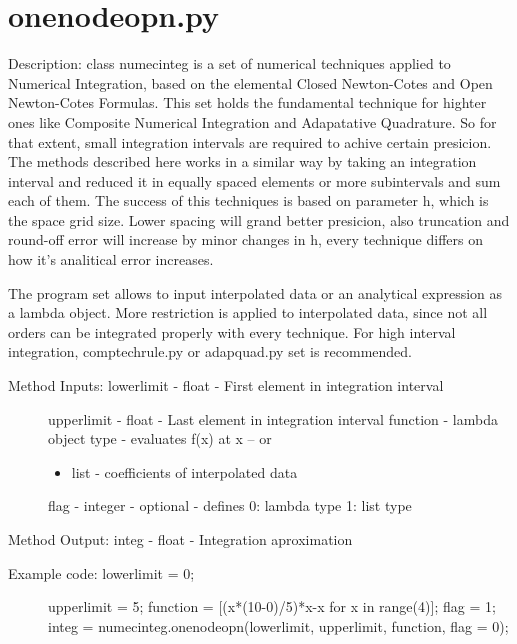\documentclass[letterpaper,10pt,oneside]{sphinxmanual}
\theoremstyle{plain}%
\theoremstyle{definition}%
\theoremstyle{remark}%
\begin{document}
\section{onenodeopn.py}
\label{code:module-onenodeopn}\label{code:onenodeopn-py}
Description: class numecinteg is a set of numerical techniques applied to
Numerical Integration, based on the elemental Closed Newton-Cotes and
Open Newton-Cotes Formulas. This set holds the fundamental technique for
highter ones like Composite Numerical Integration and Adapatative Quadrature.
So for that extent, small integration intervals are required to achive certain
presicion. The methods described here works in a similar way by taking an
integration interval and reduced it in equally spaced elements or more 
subintervals and sum each of them. The success of this techniques is based
on parameter h, which is the space grid size. Lower spacing will grand better
presicion, also truncation and round-off error will increase by minor changes
in h, every technique differs on how it's analitical error increases.

The program set allows to input interpolated data or an analytical expression
as a lambda object. More restriction is applied to interpolated data, since
not all orders can be integrated properly with every technique. For high 
interval integration, comptechrule.py or adapquad.py set is recommended.
\begin{description}
\item[{Method Inputs: lowerlimit - float - First element in integration interval}] \leavevmode
upperlimit - float - Last element in integration interval
function - lambda object type - evaluates f(x) at x -- or
\begin{itemize}
\item {} 
list - coefficients of interpolated data

\end{itemize}

flag - integer - optional - defines 0: lambda type 1: list type

\end{description}

Method Output: integ - float - Integration aproximation
\begin{description}
\item[{Example code: lowerlimit = 0;}] \leavevmode
upperlimit = 5;
function = {[}(x*(10-0)/5)*x-x for x in range(4){]};
flag = 1;
integ =                   numecinteg.onenodeopn(lowerlimit, upperlimit, function, flag = 0);

\end{description}
\end{document}
